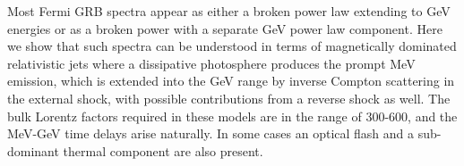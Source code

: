 


\bigskip



\bigskip

\noindent Most Fermi GRB spectra appear as either a broken power law extending to GeV energies or as a broken power with a separate GeV power law component. Here we show that such spectra can be understood in terms of magnetically dominated relativistic jets where a dissipative photosphere produces the prompt MeV emission, which is extended into the GeV range by inverse Compton scattering in the external shock, with possible contributions from a reverse shock as well. The bulk Lorentz factors required in these models are in the range of 300-600, and the MeV-GeV time delays arise naturally. In some cases an optical flash and a sub-dominant thermal component are also present.

